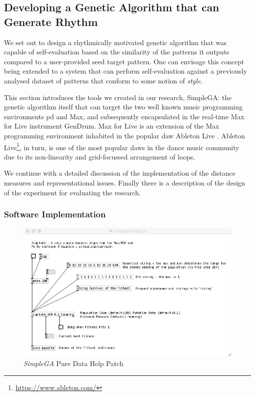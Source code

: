 \subsection{Developing a Genetic Algorithm that can Generate Rhythm}

We set out to design a rhythmically motivated genetic algorithm that was capable of self-evaluation based on the similarity of the patterns it outputs compared to a user-provided seed target pattern. One can envisage this concept being extended to a system that can perform self-evaluation against a previously analysed dataset of patterns that conform to some notion of \textit{style}. 

This section introduces the tools we created in our research, SimpleGA: the genetic algorithm itself that can target the two well known music programming environments \acrshort{pd} and Max, and subsequently encapsulated in the real-time Max for Live instrument GenDrum. Max for Live is an extension of the Max programming environment inhabited in the popular \acrshort{daw} Ableton Live \citep{Manzo2015}. Ableton Live\footnote{\url{https://www.ableton.com/}}, in turn, is one of the most popular \acrshort{daw}s in the dance music community due to its non-linearity and grid-focussed arrangement of loops. 

We continue with a detailed discussion of the implementation of the distance measures and representational issues. Finally there is a description of the design of the experiment for evaluating the research.

\subsubsection{Software Implementation}

\begin{figure}
	\begin{center}
		\includegraphics[width=\figSizeHundred]{ch03_symbolic/figures/simpleGA.png}
	\end{center}
	\caption[\textit{SimpleGA} Pure Data Help Patch]{\textit{SimpleGA} Pure Data Help Patch}
	\label{fig:simplega}
\end{figure}

